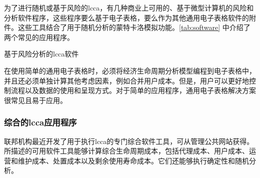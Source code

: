 为了进行随机或基于风险的\acrlong*{lcca}，有几种商业上可用的、基于微型计算机的风险和分析软件程序，这些程序要么基于电子表格，要么作为其他通用电子表格软件的附件。这些工具结合了用于随机分析的蒙特卡洛模拟功能。\cref{tab:software} 中介绍了两个常见的应用程序。

\begin{table}
  \caption{基于风险分析的\acrlong*{lcca}软件}
  \label{tab:software}
  
\end{table}

在使用简单的通用电子表格时，必须将经济生命周期分析模型编程到电子表格中，并且还必须单独计算其他考虑因素，例如合并用户成本。但是，用户可以更好地控制流程以及数据的使用和呈现方式。对于简单的应用程序，通用电子表格解决方案很常见且易于应用。


\subsubsection{综合的\acrlong*{lcca}应用程序}
联邦机构最近开发了用于执行\acrlong*{lcca}的专门综合软件工具，可从管理公共网站获得。所描述的可用软件工具能够计算综合生命周期成本，包括代理成本、用户成本、运营和维护成本、处置成本以及剩余使用寿命成本。它们还能够执行确定性和随机分析。

